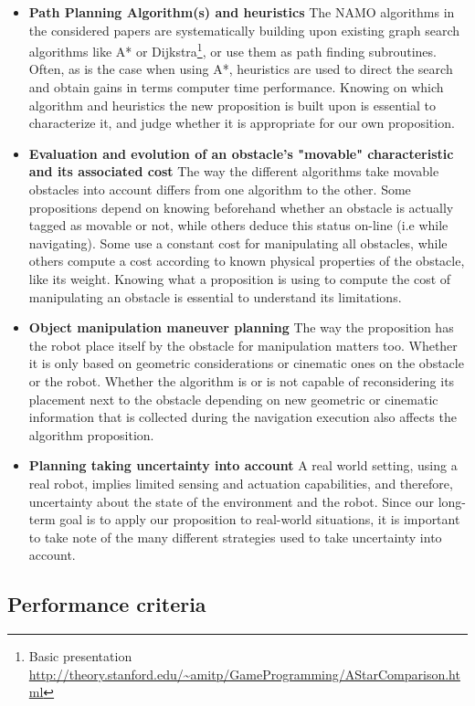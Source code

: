 \begin{itemize}
  \item \textbf{Path Planning Algorithm(s) and heuristics} The NAMO algorithms in the considered papers are systematically building upon existing graph search algorithms like A* or Dijkstra\footnote{Basic presentation \url{http://theory.stanford.edu/~amitp/GameProgramming/AStarComparison.html}}, or use them as path finding subroutines. Often, as is the case when using A*, heuristics are used to direct the search and obtain gains in terms computer time performance. Knowing on which algorithm and heuristics the new proposition is built upon is essential to characterize it, and judge whether it is appropriate for our own proposition.
  \item \textbf{Evaluation and evolution of an obstacle's "movable" characteristic and its associated cost} The way the different algorithms take movable obstacles into account differs from one algorithm to the other. Some propositions depend on knowing beforehand whether an obstacle is actually tagged as movable or not, while others deduce this status on-line (i.e while navigating). Some use a constant cost for manipulating all obstacles, while others compute a cost according to known physical properties of the obstacle, like its weight. Knowing what a proposition is using to compute the cost of manipulating an obstacle is essential to understand its limitations.
  \item \textbf{Object manipulation maneuver planning} The way the proposition has the robot place itself by the obstacle for manipulation matters too. Whether it is only based on geometric considerations or cinematic ones on the obstacle or the robot. Whether the algorithm is or is not capable of reconsidering its placement next to the obstacle depending on new geometric or cinematic information that is collected during the navigation execution also affects the algorithm proposition.
  \item \textbf{Planning taking uncertainty into account} A real world setting, using a real robot, implies limited sensing and actuation capabilities, and therefore, uncertainty about the state of the environment and the robot. Since our long-term goal is to apply our proposition to real-world situations, it is important to take note of the many different strategies used to take uncertainty into account.
\end{itemize}

\subsection{Performance criteria}

